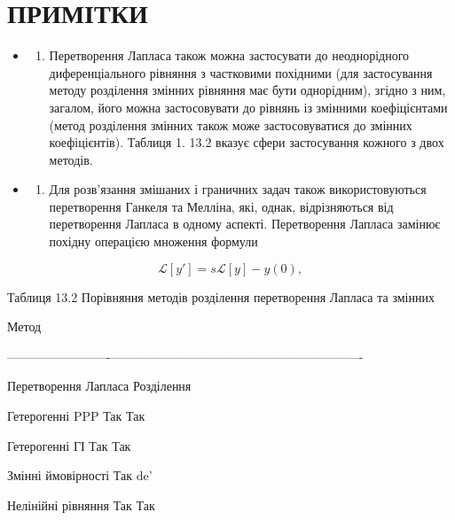 \documentclass[
  ukrainian,
]{article}
\providecommand{\tightlist}{%
  \setlength{\itemsep}{0pt}\setlength{\parskip}{0pt}}
\begin{document}
\section{ПРИМІТКИ}\label{ux43fux440ux438ux43cux456ux442ux43aux438}

\begin{itemize}
\tightlist
\item
  \begin{enumerate}
  \def\labelenumi{\arabic{enumi}.}
  \tightlist
  \item
    Перетворення Лапласа також можна застосувати до неоднорідного
    диференціального рівняння з частковими похідними (для застосування
    методу розділення змінних рівняння має бути однорідним), згідно з
    ним, загалом, його можна застосовувати до рівнянь із змінними
    коефіцієнтами (метод розділення змінних також може застосовуватися
    до змінних коефіцієнтів). Таблиця 1. 13.2 вказує сфери застосування
    кожного з двох методів.
  \end{enumerate}
\item
  \begin{enumerate}
  \def\labelenumi{\arabic{enumi}.}
  \setcounter{enumi}{1}
  \tightlist
  \item
    Для розв'язання змішаних і граничних задач також використовуються
    перетворення Ганкеля та Мелліна, які, однак, відрізняються від
    перетворення Лапласа в одному аспекті. Перетворення Лапласа замінює
    похідну операцією множення формули
  \end{enumerate}
\end{itemize}

\[
\mathscr{L}[y'] = s\mathscr{L}[y] - y(0),
\]

Таблиця 13.2 Порівняння методів розділення перетворення Лапласа та
змінних

\textbar{} Метод \textbar{} \textbar{}

\textbar-------------------------\textbar---------------------------\textbar----------------------------------\textbar{}

\textbar{} Перетворення Лапласа \textbar{} Розділення \textbar{}

Гетерогенні PPP \textbar{} Так \textbar{} Так \textbar{}

Гетерогенні ГІ \textbar{} Так \textbar{} Так \textbar{}

Змінні ймовірності \textbar{} Так \textbar{} de' \textbar{}

Нелінійні рівняння \textbar{} Так \textbar{} Так \textbar{}
\end{document}
